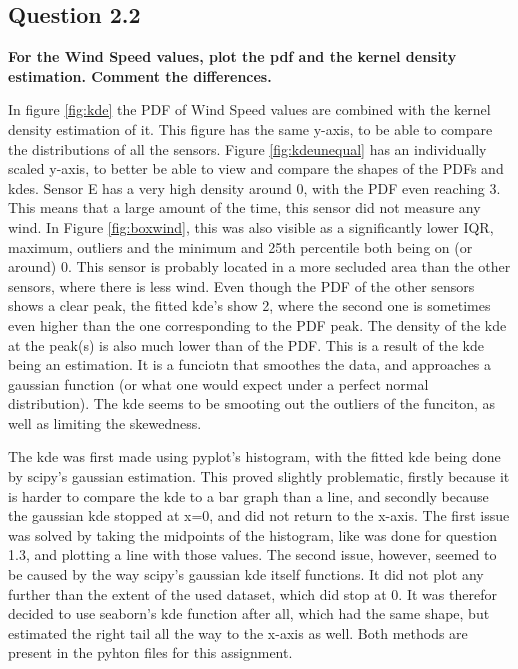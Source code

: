 \documentclass{report}
\begin{document}
	\subsection{Question 2.2}
	\textbf{For the Wind Speed values, plot the pdf and the kernel density estimation. Comment the differences.}
	
	In figure \ref{fig:kde} the PDF of Wind Speed values are combined with the kernel density estimation of it. This figure has the same y-axis, to be able to compare the distributions of all the sensors. Figure \ref{fig:kdeunequal} has an individually scaled y-axis, to better be able to view and compare the shapes of the PDFs and kdes. Sensor E has a very high density around 0, with the PDF even reaching 3. This means that a large amount of the time, this sensor did not measure any wind. In Figure \ref{fig:boxwind}, this was also visible as a significantly lower IQR, maximum, outliers and the minimum and 25th percentile both being on (or around) 0. This sensor is probably located in a more secluded area than the other sensors, where there is less wind. Even though the PDF of the other sensors shows a clear peak, the fitted kde's show 2, where the second one is sometimes even higher than the one corresponding to the PDF peak. The density of the kde at the peak(s) is also much lower than of the PDF. This is a result of the kde being an estimation. It is a funciotn that smoothes the data, and approaches a gaussian function (or what one would expect under a perfect normal distribution). The kde seems to be smooting out the outliers of the funciton, as well as limiting the skewedness.
	
	The kde was first made using pyplot's histogram, with the fitted kde being done by scipy's gaussian estimation. This proved slightly problematic, firstly because it is harder to compare the kde to a bar graph than a line, and secondly because the gaussian kde stopped at x=0, and did not return to the x-axis. The first issue was solved by taking the midpoints of the histogram, like was done for question 1.3, and plotting a line with those values. The second issue, however, seemed to be caused by the way scipy's gaussian kde itself functions. It did not plot any further than the extent of the used dataset, which did stop at 0. It was therefor decided to use seaborn's kde function after all, which had the same shape, but estimated the right tail all the way to the x-axis as well. Both methods are present in the pyhton files for this assignment.
	
\end{document}
